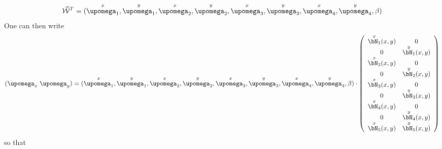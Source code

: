 \[
\vec{\cal W}^T=
(
\overset{\tiny x}{\upomega_1},\overset{\tiny y}{\upomega_1},
\overset{\tiny x}{\upomega_2},\overset{\tiny y}{\upomega_2},
\overset{\tiny x}{\upomega_3},\overset{\tiny y}{\upomega_3},
\overset{\tiny x}{\upomega_4},\overset{\tiny y}{\upomega_4},\beta)
\]
One can then write
\[
(\upomega_x \; \upomega_y)
=
(
\overset{\tiny x}{\upomega_1},\overset{\tiny y}{\upomega_1},
\overset{\tiny x}{\upomega_2},\overset{\tiny y}{\upomega_2},
\overset{\tiny x}{\upomega_3},\overset{\tiny y}{\upomega_3},
\overset{\tiny x}{\upomega_4},\overset{\tiny y}{\upomega_4},\beta)
\cdot
\left(
\begin{array}{cc}
\overset{x}{\bN_1}(x,y) & 0 \\
0 & \overset{y}{\bN_1}(x,y) \\
\overset{x}{\bN_2}(x,y) & 0 \\
0 & \overset{y}{\bN_2}(x,y) \\
\overset{x}{\bN_3}(x,y) & 0 \\
0 & \overset{y}{\bN_3}(x,y) \\
\overset{x}{\bN_4}(x,y) & 0 \\
0 & \overset{y}{\bN_4}(x,y) \\
\overset{x}{\bN_5}(x,y)  & \overset{y}{\bN_5}(x,y) 
\end{array}
\right)
\]
so that 
